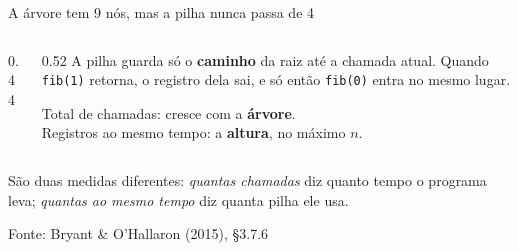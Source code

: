 \documentclass[aspectratio=169]{beamer}
\newcommand{\fonte}[1]{\vfill\hfill{\scriptsize\textcolor{UFSGray}{Fonte: #1}}}
\begin{document}
\begin{frame}{A árvore tem 9 nós, mas a pilha nunca passa de 4}
  \begin{columns}[c]
    \begin{column}{0.44\textwidth}
      \begin{center}
      \end{center}
    \end{column}
    \begin{column}{0.52\textwidth}
      \small
      A pilha guarda só o \textbf{caminho} da raiz até a chamada atual.
      Quando \texttt{fib(1)} retorna, o registro dela sai, e só então
      \texttt{fib(0)} entra no mesmo lugar.

      \medskip
      Total de chamadas: cresce com a \textbf{árvore}.\\
      Registros ao mesmo tempo: a \textbf{altura}, no máximo $n$.
    \end{column}
  \end{columns}
  \begin{block}{}
    \small São duas medidas diferentes: \emph{quantas chamadas} diz quanto
    tempo o programa leva; \emph{quantas ao mesmo tempo} diz quanta pilha
    ele usa.
  \end{block}
  \fonte{Bryant \& O'Hallaron (2015), §3.7.6~\cite{bryant2015computer}}
\end{frame}
\end{document}

